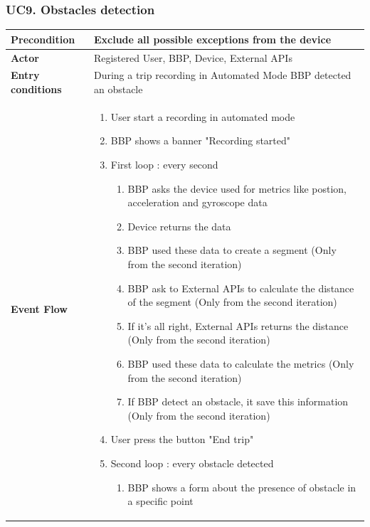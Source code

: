 \subsubsection*{UC9. Obstacles detection}

\begin{table}[H]
\centering
\renewcommand{\arraystretch}{1.4} 
\begin{tabularx}{\textwidth}{|p{3.5cm}|X|}
\hline
\textbf{Precondition} & Exclude all possible exceptions from the device\\ \hline
\textbf{Actor} & Registered User, BBP, Device, External APIs \\ \hline
\textbf{Entry conditions} & During a trip recording in Automated Mode BBP detected an obstacle \\ \hline
\textbf{Event Flow} & \vspace{0pt}
\begin{enumerate}[nosep, leftmargin=*] 
    \item User start a recording in automated mode
    \item BBP shows a banner "Recording started"
    \item First loop : every second \begin{enumerate} 
        \item BBP asks the device used for metrics like postion, acceleration and gyroscope data
        \item Device returns the data
        \item BBP used these data to create a segment (Only from the second iteration)
        \item BBP ask to External APIs to calculate the distance of the segment (Only from the second iteration)
        \item If it's all right, External APIs returns the distance (Only from the second iteration)
        \item BBP used these data to calculate the metrics (Only from the second iteration)
        \item If BBP detect an obstacle, it save this information (Only from the second iteration)
    \end{enumerate}
    \item User press the button "End trip"
    \item Second loop : every obstacle detected \begin{enumerate} 
        \item BBP shows a form about the presence of obstacle in a specific point

\end{enumerate}
\end{enumerate}
\end{tabularx}
\end{table}

